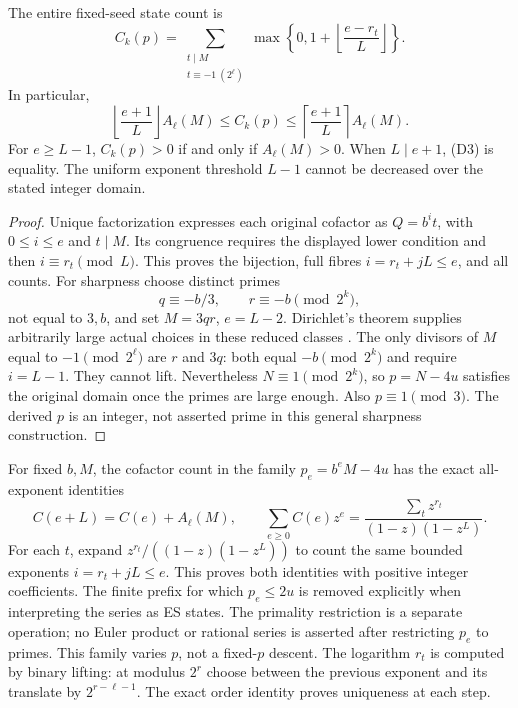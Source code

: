 \begin{theorem}
The entire fixed-seed state count is
\[
 \boxed{C_k(p)=\sum_{\substack{t\mid M\\t\equiv-1\ (2^\ell)}}
 \max\left\{0,1+\left\lfloor\frac{e-r_t}{L}\right\rfloor\right\}.} \tag{D2}
\]
In particular,
\[
 \left\lfloor\frac{e+1}{L}\right\rfloor A_\ell(M)
 \le C_k(p)\le
 \left\lceil\frac{e+1}{L}\right\rceil A_\ell(M).              \tag{D3}
\]
For $e\ge L-1$, $C_k(p)>0$ if and only if $A_\ell(M)>0$.
When $L\mid e+1$, (D3) is equality. The uniform exponent threshold $L-1$
cannot be decreased over the stated integer domain.
\end{theorem}
\begin{proof}
Unique factorization expresses each original cofactor as $Q=b^it$, with
$0\le i\le e$ and $t\mid M$. Its congruence requires the displayed lower
condition and then $i\equiv r_t\pmod L$. This proves the bijection, full fibres
$i=r_t+jL\le e$, and all counts. For sharpness choose distinct primes
\[
 q\equiv-b/3,\qquad r\equiv-b\pmod{2^k},
\]
not equal to $3,b$, and set $M=3qr$, $e=L-2$.
Dirichlet's theorem supplies arbitrarily large actual choices in these reduced
classes \cite[Theorem 18.1]{Dirichlet}. The only divisors of $M$ equal to
$-1\pmod{2^\ell}$ are $r$ and $3q$: both equal $-b\pmod{2^k}$ and require
$i=L-1$. They cannot lift. Nevertheless $N\equiv1\pmod{2^k}$, so
$p=N-4u$ satisfies the original domain once the primes are large enough.
Also $p\equiv1\pmod3$. The derived $p$ is an integer, not asserted prime in
this general sharpness construction.
\end{proof}

For fixed $b,M$, the cofactor count in the family $p_e=b^eM-4u$ has the exact
all-exponent identities
\[
 C(e+L)=C(e)+A_\ell(M),\qquad
 \sum_{e\ge0}C(e)z^e=
 \frac{\sum_t z^{r_t}}{(1-z)(1-z^L)}.                    \tag{D3a}
\]
For each $t$, expand $z^{r_t}/((1-z)(1-z^L))$ to count the same bounded
exponents $i=r_t+jL\le e$. This proves both identities with positive integer
coefficients. The finite prefix for which $p_e\le2u$ is removed explicitly
when interpreting the series as ES states. The primality restriction is a
separate operation; no Euler product or rational series is asserted after
restricting $p_e$ to primes. This family varies $p$, not a fixed-$p$ descent.
The logarithm $r_t$ is computed by binary lifting: at modulus $2^r$ choose
between the previous exponent and its translate by $2^{r-\ell-1}$.
The exact order identity proves uniqueness at each step.

